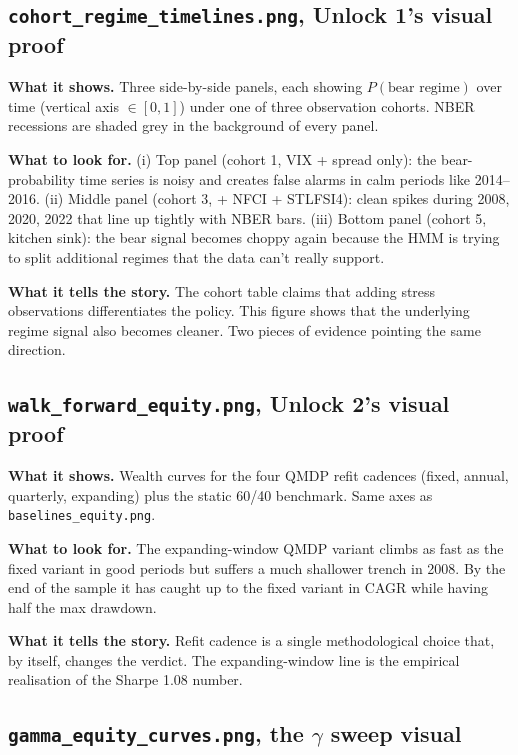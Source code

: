 \documentclass[11pt]{article}
\begin{document}
\subsection{\texttt{cohort\_regime\_timelines.png}, Unlock 1's visual proof}

\textbf{What it shows.} Three side-by-side panels, each showing $P(\text{bear regime})$ over time (vertical axis $\in [0, 1]$) under one of three observation cohorts. NBER recessions are shaded grey in the background of every panel.

\textbf{What to look for.} (i) Top panel (cohort 1, VIX + spread only): the bear-probability time series is noisy and creates false alarms in calm periods like 2014--2016. (ii) Middle panel (cohort 3, + NFCI + STLFSI4): clean spikes during 2008, 2020, 2022 that line up tightly with NBER bars. (iii) Bottom panel (cohort 5, kitchen sink): the bear signal becomes choppy again because the HMM is trying to split additional regimes that the data can't really support.

\textbf{What it tells the story.} The cohort table claims that adding stress observations differentiates the policy. This figure shows that the underlying regime signal also becomes cleaner. Two pieces of evidence pointing the same direction.

\subsection{\texttt{walk\_forward\_equity.png}, Unlock 2's visual proof}

\textbf{What it shows.} Wealth curves for the four QMDP refit cadences (fixed, annual, quarterly, expanding) plus the static 60/40 benchmark. Same axes as \texttt{baselines\_equity.png}.

\textbf{What to look for.} The expanding-window QMDP variant climbs as fast as the fixed variant in good periods but suffers a much shallower trench in 2008. By the end of the sample it has caught up to the fixed variant in CAGR while having half the max drawdown.

\textbf{What it tells the story.} Refit cadence is a single methodological choice that, by itself, changes the verdict. The expanding-window line is the empirical realisation of the Sharpe 1.08 number.

\subsection{\texttt{gamma\_equity\_curves.png}, the $\gamma$ sweep visual}
\end{document}
